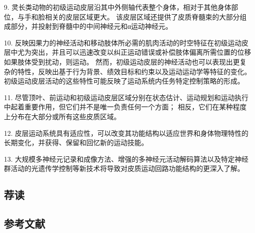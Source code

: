 9. 灵长类动物的初级运动皮层沿其中外侧轴代表整个身体，相对于其他身体部位，与手和脸相关的皮层区域更大。 该皮层区域还提供了皮质脊髓束的大部分组成部分，并投射到脊髓中的中间神经元和α运动神经元。

10. 反映因果力的神经活动和移动肢体所必需的肌肉活动的时空特征在初级运动皮层中尤为突出，并且可以迅速改变以纠正运动错误或补偿肢体偏离所需位置的位移 如果肢体受到扰动，则运动。 然而，初级运动皮层的神经活动也可以表现出更复杂的特性，反映出基于行为背景、绩效目标和约束以及运动运动学等特征的变化。 初级运动皮层活动的这些特性可能反映了运动系统内任务特定控制策略的形成。

11. 尽管顶叶、前运动和初级运动皮层区域分别在状态估计、运动规划和运动执行中起着重要作用，但它们并不是唯一负责任何一个方面； 相反，它们在某种程度上分布在大部分或所有这些皮质区域。

12. 皮层运动系统具有适应性，可以改变其功能结构以适应世界和身体物理特性的长期变化，并获得、保留和回忆新的运动技能。

13. 大规模多神经元记录和成像方法、增强的多神经元活动解码算法以及特定神经群活动的光遗传学控制等新技术将导致对皮质运动回路功能结构的更深入了解。

\subsection{荐读}
\subsection{参考文献}